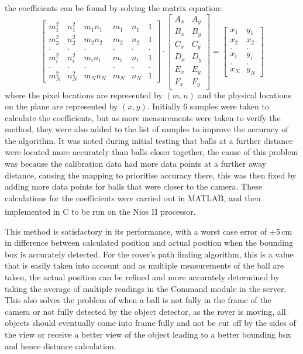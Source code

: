 \documentclass[a4paper]{article}
\newcommand{\unit}[1]{\ensuremath{\, \mathrm{#1}}}
\begin{document}
the coefficients can be found by solving the matrix equation: $$
    \begin{bmatrix}
        m^2_1 & n^2_1 & m_1n_1 & m_1 & n_1 & 1 \\
        m^2_2 & n^2_2 & m_2n_2 & m_2 & n_2 & 1 \\
        .     & .     &    .   &  .  & .   & . \\
        m^2_i & n^2_i & m_in_i & m_i & n_i & 1 \\  
        .     & .     &    .   &  .  & .   & . \\
        m^2_N & n^2_N & m_Nn_N & m_N & n_N & 1  
    \end{bmatrix}
    \cdot
    \begin{bmatrix}
        A_x & A_y \\
        B_x & B_y \\
        C_x & C_y \\
        D_x & D_y \\
        E_x & E_y \\
        F_x & F_y
    \end{bmatrix}
    =
    \begin{bmatrix}
        x_1 & y_1 \\
        x_2 & x_2 \\
        . & . \\
        x_i & y_i \\
        . & . \\
        x_N & y_N
    \end{bmatrix}
$$ where the pixel locations are represented by \((m,n)\) and the physical locations on
the plane are represented by \((x,y)\). Initially 6 samples were taken to calculate 
the coefficients, but as more measurements were taken to verify the method, they
were also added to the list of samples to improve the accuracy of the algorithm.
It was noted during initial testing that balls at a further distance were located
more accurately than balls closer together, the cause of this problem was because
the calibration data had more data points at a further away distance, causing the mapping
to prioritise accuracy there, this was then fixed by adding more data points for 
balls that were closer to the camera. 
These calculations for the coefficients were carried out in MATLAB, and then 
implemented in C to be run on the Nios\textsuperscript{\textregistered} II processor. 

This method is satisfactory in its performance, with a worst case error of \(\pm5\unit{cm}\)
in difference between calculated position and actual position when the bounding box is accurately detected. 
For the rover's path finding algorithm, this is a value that is easily taken into account and as
multiple measurements of the ball are taken, the actual position can be refined 
and more accurately determined by taking the average of multiple readings in the 
Command module in the server. This also solves the problem of when a ball is not 
fully in the frame of the camera or not fully detected by the object detector,
as the rover is moving, all objects should eventually come into frame fully and 
not be cut off by the sides of the view or receive a better view of the object 
leading to a better bounding box and hence distance calculation. 
\end{document}
